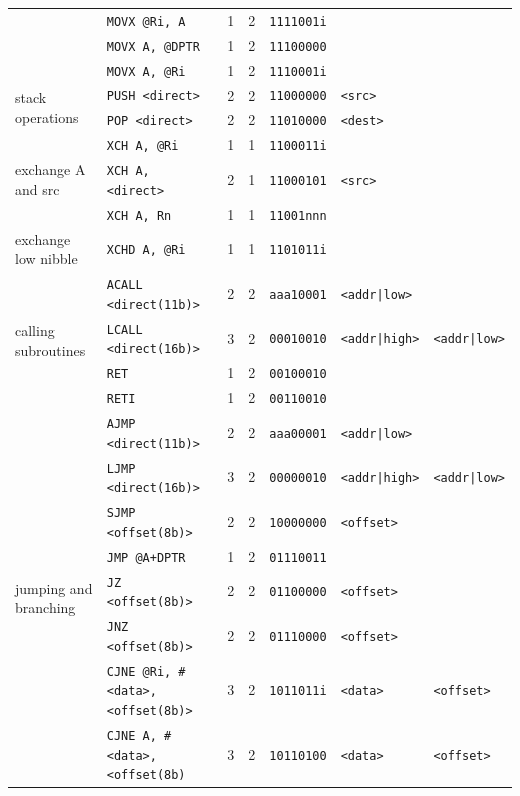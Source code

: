 \documentclass[journal]{IEEEtran}
\begin{document}
{{\begin{tabular}{|l|l|l|l|l|l|l|}
		& \texttt{MOVX @Ri, A} & 1 & 2 & \texttt{1111001i} & & \\
		& \texttt{MOVX A, @DPTR} & 1 & 2 & \texttt{11100000} & & \\
		& \texttt{MOVX A, @Ri} & 1 & 2 & \texttt{1110001i} & & \\
		\hline
		\multirow{2}{*}{stack operations}
		& \texttt{PUSH <direct>} & 2 & 2 & \texttt{11000000} & \texttt{<src>} & \\
		& \texttt{POP <direct>} & 2 & 2 & \texttt{11010000} & \texttt{<dest>} & \\
		\hline
		\multirow{3}{*}{exchange A and src}
		& \texttt{XCH A, @Ri} & 1 & 1 & \texttt{1100011i} & & \\
		& \texttt{XCH A, <direct>} & 2 & 1 & \texttt{11000101} & \texttt{<src>} & \\
		& \texttt{XCH A, Rn} & 1 & 1 & \texttt{11001nnn} & & \\
		\hline
		exchange low nibble
		& \texttt{XCHD A, @Ri} & 1 & 1 & \texttt{1101011i} & & \\
		\hline
		\multirow{4}{*}{calling subroutines}
		& \texttt{ACALL <direct(11b)>} & 2 & 2 & \texttt{aaa10001} & \texttt{<addr|low>} & \\
		& \texttt{LCALL <direct(16b)>} & 3 & 2 & \texttt{00010010} & \texttt{<addr|high>} & \texttt{<addr|low>} \\
		& \texttt{RET} & 1 & 2 & \texttt{00100010} & & \\
		& \texttt{RETI} & 1 & 2 & \texttt{00110010} & & \\
		\hline
		\multirow{12}{*}{jumping and branching}
		& \texttt{AJMP <direct(11b)>} & 2 & 2 & \texttt{aaa00001} & \texttt{<addr|low>} & \\
		& \texttt{LJMP <direct(16b)>} & 3 & 2 & \texttt{00000010} & \texttt{<addr|high>} & \texttt{<addr|low>} \\
		& \texttt{SJMP <offset(8b)>} & 2 & 2 & \texttt{10000000} & \texttt{<offset>} & \\
		& \texttt{JMP @A+DPTR} & 1 & 2 & \texttt{01110011} & & \\
		& \texttt{JZ <offset(8b)>} & 2 & 2 & \texttt{01100000} & \texttt{<offset>} & \\
		& \texttt{JNZ <offset(8b)>} & 2 & 2 & \texttt{01110000} & \texttt{<offset>} & \\
		& \texttt{CJNE @Ri, \#<data>, <offset(8b)>} & 3 & 2 & \texttt{1011011i} & \texttt{<data>} & \texttt{<offset>} \\
		& \texttt{CJNE A, \#<data>, <offset(8b)} & 3 & 2 & \texttt{10110100} & \texttt{<data>} & \texttt{<offset>} \\

\end{tabular}}}
\end{document}

